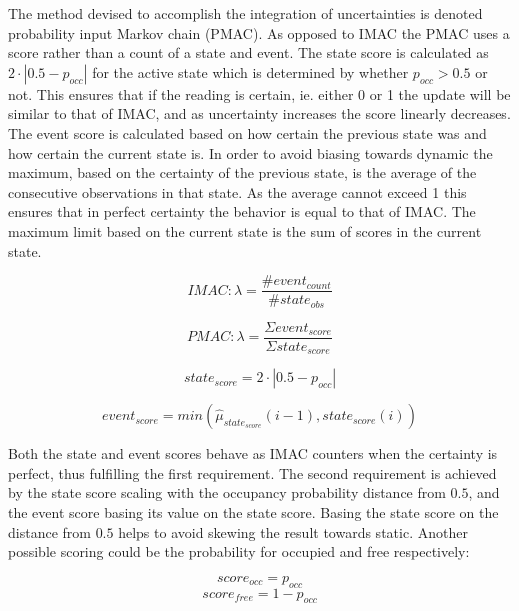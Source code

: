 The method devised to accomplish the integration of uncertainties is denoted probability input Markov chain (PMAC). As opposed to IMAC the PMAC uses a score rather than a count of a state and event. The state score is calculated as  \(2\cdot|0.5-p_{occ}|\) for the active state which is determined by whether \(p_{occ} > 0.5\) or not. This ensures that if the reading is certain, ie. either 0 or 1 the update will be similar to that of IMAC, and as uncertainty increases the score linearly decreases. The event score is calculated based on how certain the previous state was and how certain the current state is. In order to avoid biasing towards dynamic the maximum, based on the certainty of the previous state, is the average of the consecutive observations in that state. As the average cannot exceed 1 this ensures that in perfect certainty the behavior is equal to that of IMAC. The maximum limit based on the current state is the sum of scores in the current state.

\begin{equation}
IMAC: \lambda = \frac{\#event_{count}}{\#state_{obs}}
\end{equation}

\begin{equation}
PMAC: \lambda = \frac{\Sigma event_{score}}{\Sigma state_{score}}
\label{eq:pmac_lambda}
\end{equation}

\begin{equation}
state_{score}=2 \cdot |0.5-p_{occ}| 
\end{equation}

\begin{equation}
event_{score}=min(\hat{\mu}_{state_{score}}(i-1),state_{score}(i))
\end{equation}

Both the state and event scores behave as IMAC counters when the certainty is perfect, thus fulfilling the first requirement. The second requirement is achieved by the state score scaling with the occupancy probability distance from $0.5$, and the event score basing its value on the state score. Basing the state score on the distance from $0.5$ helps to avoid skewing the result towards static. Another possible scoring could be the probability for occupied and free respectively: 

\begin{equation}
score_{occ} = p_{occ}
\end{equation}
\begin{equation}
score_{free} = 1-p_{occ}
\end{equation}

